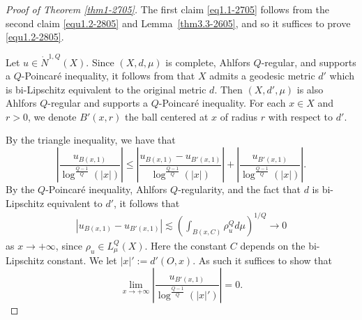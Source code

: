 \documentclass[10pt]{amsart}
\numberwithin{equation}{section}
\begin{document}
 \begin{proof}[Proof of Theorem \ref{thm1-2705}] 
 The first  claim \eqref{eq1.1-2705} follows from the second claim \eqref{equ1.2-2805} and Lemma~\ref{thm3.3-2605}, and so it suffices to prove \eqref{equ1.2-2805}.

 Let $u\in\dot N^{1,Q}(X)$.  Since $(X,d,\mu)$ is complete, Ahlfors $Q$-regular, and supports a $Q$-Poincar\'e inequality, it follows from \cite[Corollary~8.3.16]{pekka} that $X$ admits a geodesic metric $d'$ which is bi-Lipschitz equivalent to the original metric $d$.  Then $(X,d',\mu)$ is also Ahlfors $Q$-regular and supports a $Q$-Poincar\'e inequality.  For each $x\in X$ and $r>0$, we  denote $B'(x,r)$  the ball centered at $x$ of radius $r$ with respect to $d'$. 

 By the triangle inequality, we have that 
 \[
 \left|\frac{u_{B(x,1)}}{\log^{\frac{Q-1}{Q}}(|x|)}\right|\le\left|\frac{u_{B(x,1)}-u_{B'(x,1)}}{\log^{\frac{Q-1}{Q}}(|x|)}\right|+\left|\frac{u_{B'(x,1)}}{\log^{\frac{Q-1}{Q}}(|x|)}\right|.
 \]
 By the $Q$-Poincar\'e inequality, Ahlfors $Q$-regularity, and the fact that $d$ is bi-Lipschitz equivalent to $d'$, it follows that 
 \begin{align*}
     |u_{B(x,1)}-u_{B'(x,1)}|\lesssim\left(\int_{B(x,C)}\rho_u^Qd\mu\right)^{1/Q}\to 0
 \end{align*}
 as $x\to+\infty$, since $\rho_u\in L^Q_\mu(X)$.  Here the constant $C$ depends on the bi-Lipschitz constant. We let $|x|':=d'(O,x)$.  As such it suffices to show that 
 \[
 \lim_{x\to+\infty}\left|\frac{u_{B'(x,1)}}{\log^{\frac{Q-1}{Q}}(|x|')}\right|=0.
 \]
 	

\end{proof}
\end{document}
